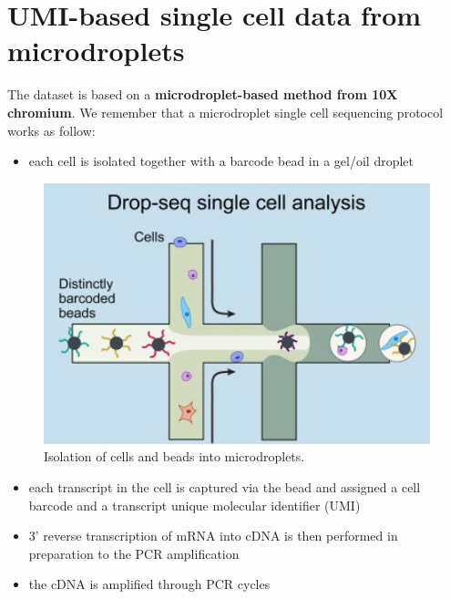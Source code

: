 \documentclass[
  letterpaper,
  DIV=11,
  numbers=noendperiod]{scrartcl}
\providecommand{\tightlist}{%
  \setlength{\itemsep}{0pt}\setlength{\parskip}{0pt}}\usepackage{longtable,booktabs,array}
\begin{document}
\hypertarget{umi-based-single-cell-data-from-microdroplets}{%
\section{UMI-based single cell data from
microdroplets}\label{umi-based-single-cell-data-from-microdroplets}}

The dataset is based on a \textbf{microdroplet-based method from 10X
chromium}. We remember that a microdroplet single cell sequencing
protocol works as follow:

\begin{itemize}
\tightlist
\item
  each cell is isolated together with a barcode bead in a gel/oil
  droplet
\end{itemize}

\begin{figure}

{\centering \includegraphics[width=6.25in,height=\textheight]{images/dropletisolation.jpg}

}

\caption{\label{fig-beads}Isolation of cells and beads into
microdroplets.}

\end{figure}

\begin{itemize}
\tightlist
\item
  each transcript in the cell is captured via the bead and assigned a
  cell barcode and a transcript unique molecular identifier (UMI)
\item
  3' reverse transcription of mRNA into cDNA is then performed in
  preparation to the PCR amplification
\item
  the cDNA is amplified through PCR cycles
\end{itemize}
\end{document}
